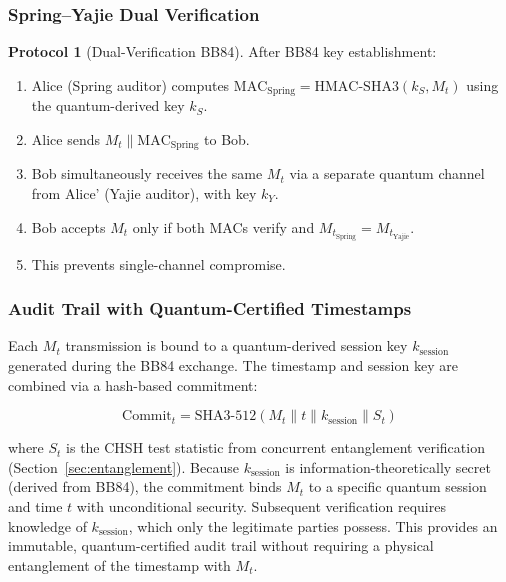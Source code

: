 \documentclass[11pt,a4paper]{article}
\theoremstyle{plain}
\theoremstyle{definition}
\newtheorem{protocol}[theorem]{Protocol}
\theoremstyle{remark}
\newcommand{\Mt}{M_t}
\begin{document}
\subsubsection{Spring--Yajie Dual Verification}

\begin{protocol}[Dual-Verification BB84]\label{prot:dual_verify}
After BB84 key establishment:
\begin{enumerate}[label=(\arabic*)]
  \item Alice (Spring auditor) computes $\text{MAC}_{\text{Spring}} =
        \text{HMAC-SHA3}(k_S, \Mt)$ using the quantum-derived key $k_S$.
  \item Alice sends $\Mt \parallel \text{MAC}_{\text{Spring}}$ to Bob.
  \item Bob simultaneously receives the same $\Mt$ via a separate quantum
        channel from Alice' (Yajie auditor), with key $k_Y$.
  \item Bob accepts $\Mt$ only if both MACs verify and
        $\Mt_{\text{Spring}} = \Mt_{\text{Yajie}}$.
  \item This prevents single-channel compromise.
\end{enumerate}
\end{protocol}

\subsubsection{Audit Trail with Quantum-Certified Timestamps}

Each $\Mt$ transmission is bound to a quantum-derived session key
$k_{\text{session}}$ generated during the BB84 exchange. The timestamp
and session key are combined via a hash-based commitment:

\[
\text{Commit}_t = \text{SHA3-512}(\Mt \parallel t \parallel k_{\text{session}} \parallel S_t)
\]

where $S_t$ is the CHSH test statistic from concurrent entanglement
verification (Section~\ref{sec:entanglement}). Because $k_{\text{session}}$
is information-theoretically secret (derived from BB84), the commitment
binds $\Mt$ to a specific quantum session and time $t$ with
unconditional security. Subsequent verification requires knowledge of
$k_{\text{session}}$, which only the legitimate parties possess.
This provides an immutable, quantum-certified audit trail without
requiring a physical entanglement of the timestamp with $\Mt$.

\end{document}
